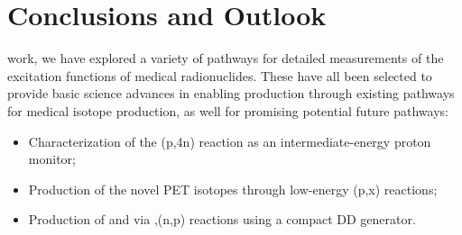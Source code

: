 \chapter{Conclusions and Outlook}

 work, we have explored a variety of pathways for detailed measurements of the excitation functions of medical radionuclides. 
These have all been selected to provide basic science advances in enabling production through  existing pathways for medical isotope production, as well for promising potential future pathways:
\begin{itemize}
 \item Characterization of the (p,4n) reaction as an intermediate-energy proton monitor;
 \item Production of the   novel PET isotopes through low-energy (p,x) reactions;
 \item Production of   and  via ,(n,p) reactions using a compact DD generator.
\end{itemize}


